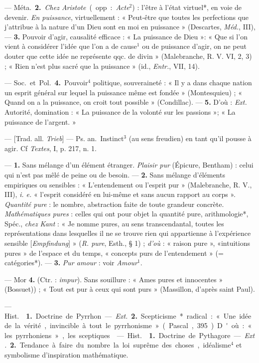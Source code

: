 \begin{itemize}[leftmargin=1cm, label=, itemsep=1pt]
— \si{Méta.} {\bf 2.} {\it Chez Aristote} (opp. : {\it Acte}$^2$) : l'être à
l’état virtuel*, en voie de devenir. {\it En puissance}, virtuellement : «
Peut-être que toutes les perfections que j'attribue à la nature d'un Dieu
sont en moi en puissance » (Descartes, {\it Méd.}, III), — {\bf 3.} Pouvoir
d'agir, causalité efficace : « La puissance de Dieu »: « Que si l’on vient à
considérer l’idée que l'on a de cause$^1$ ou de puissance d'agir, on ne peut
douter que cette idée ne représente qqc. de divin » (Malebranche, R. V. VI,
2, 3) ; « Rien n'est plus sacré que la puissance » (id., {\it Entr.}, VII,
14).

— \si{Soc.} et \si{Pol.} {\bf 4.} Pouvoir$^4$ politique, souveraineté : « Il
y a dans chaque nation un esprit général sur lequel la puissance même est
fondée » (Montesquieu) ; « Quand on a la puissance, on croit tout possible
» (Condillac). — {\bf 5.} D'où : {\it Ext.} Autorité, domination : « La
puissance de la volonté sur les passions »; « La puissance de l'argent. »

 — [Trad. all. {\it Trieb}] — \si{Ps. an.} Instinct$^3$ (au sens
freudien) en tant qu'il pousse à agir. Cf {\it Textes}, I, p. 217, n. 1.

 — {\bf 1.} Sans mélange d’un élément étranger. {\it Plaisir pur}
(Épicure, Bentham) : celui qui n’est pas mêlé de peine ou de besoin. —
{\bf 2.} Sans mélange d’éléments empiriques ou sensibles : « L’entendement
ou l’esprit pur » (Malebranche, R. V., III), {\it i. e.} « l'esprit
considéré en lui-même et sans aucun rapport au corps ».
{\it Quantité pure} : le nombre, abstraction faite de toute grandeur
concrète. {\it Mathématiques pures} : celles qui ont pour objet la quantité
pure, arithmologie*, Spéc., {\it chez Kant} : « Je nomme pures, au sens
transcendantal, toutes les représentations dans lesquelles il ne se trouve
rien qui appartienne à l'expérience sensible [{\it Empfindung}] »
({\it R. pure}, Esth., § 1) ; {\it d’où} : « raison pure », «intuitions
pures » de l'espace et du temps, « concepts purs de l’entendement »
(= catégories*). — {\bf 3.} {\it Pur amour} : voir {\it Amour}$^1$.

— Mor {\bf 4.} (Ctr. : {\it impur}). Sans souillure : « Ames pures et
innocentes » (Bossuet)) ; « Tout est pur à ceux qui sont purs » (Massillon,
d’après saint Paul).

 — \si{Hist.}  {\bf 1.} Doctrine de Pyrrhon.
— {\it Ext.} {\bf 2.} Scepticisme* radical : « Une idée de la vérité,
invincible à tout le pyrrhonisme » (Pascal, 395). D'où : « les pyrrhoniens
», les sceptiques.

 — \si{Hist.}  {\bf 1.} Doctrine de
Pythagore. — {\it Ext.} {\bf 2.} Tendance à faire du nombre la loi suprême
des choses, idéalisme$^4$ et symbolisme d'inspiration mathématique.

	\end{itemize}
